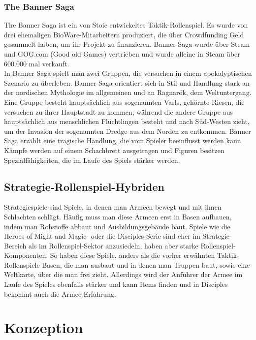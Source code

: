 \documentclass[extern,palatino]{cgBA}
\begin{document}
\subsubsection{The Banner Saga}
The Banner Saga ist ein von Stoic entwickeltes Taktik-Rollenspiel. Es wurde von drei ehemaligen BioWare-Mitarbeitern produziert, die über Crowdfunding Geld gesammelt haben, um ihr Projekt zu finanzieren. Banner Saga wurde über Steam und GOG.com (Good old Games) vertrieben und wurde alleine in Steam über 600.000 mal verkauft.
\\In Banner Saga spielt man zwei Gruppen, die versuchen in einem apokalyptischen Szenario zu überleben. Banner Saga orientiert sich in Stil und Handlung stark an der nordischen Mythologie im allgemeinen und an Ragnarök, dem Weltuntergang. Eine Gruppe besteht hauptsächlich aus sogenannten Varls, gehörnte Riesen, die versuchen zu ihrer Hauptstadt zu kommen, während die andere Gruppe aus hauptsächlich aus menschlichen Flüchtlingen besteht und nach Süd-Westen zieht, um der Invasion der sogenannten Dredge aus dem Norden zu entkommen.
Banner Saga erzählt eine tragische Handlung, die vom Spieler beeinflusst werden kann. Kämpfe werden auf einem Schachbrett ausgetragen und Figuren besitzen Spezialfähigkeiten, die im Laufe des Spiels stärker werden. 
\subsection{Strategie-Rollenspiel-Hybriden} Strategiespiele sind Spiele, in denen man Armeen bewegt und mit ihnen Schlachten schlägt. Häufig muss man diese Armeen erst in Basen aufbauen, indem man Rohstoffe abbaut und Ausbildungsgebäude baut. Spiele wie die Heroes of Might and Magic- oder die Disciples Serie sind eher im Strategie-Bereich als im Rollenspiel-Sektor anzusiedeln, haben aber starke Rollenspiel-Komponenten. So haben diese Spiele, anders als die vorher erwähnten Taktik-Rollenspiele Basen, die man ausbaut und in denen man Truppen baut, sowie eine Weltkarte, über die man frei zieht. Allerdings wird der Anführer der Armee im Laufe des Spieles ebenfalls stärker und kann Items finden und in Disciples bekommt auch die Armee Erfahrung.


\newpage
\section {Konzeption}
\end{document}
